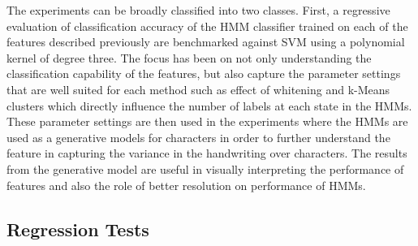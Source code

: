 \documentclass[runningheads]{llncs}
\begin{document}
The experiments can be broadly classified into two classes. First, a regressive evaluation of classification accuracy of the HMM classifier trained on each of the features described previously are benchmarked against SVM using a polynomial kernel of degree three. The focus has been on not only understanding the classification capability of the features, but also capture the parameter settings that are well suited for each method such as effect of whitening and k-Means clusters which directly influence the number of labels at each state in the HMMs.
These parameter settings are then used in the experiments where the HMMs are used as a generative models for characters in order to further understand the feature in capturing the variance in the handwriting over characters. The results from the generative model are useful in visually interpreting the performance of features and also the role of better resolution on performance of HMMs.


\label{ssec:eval}
\subsection{Regression Tests}
\end{document}
